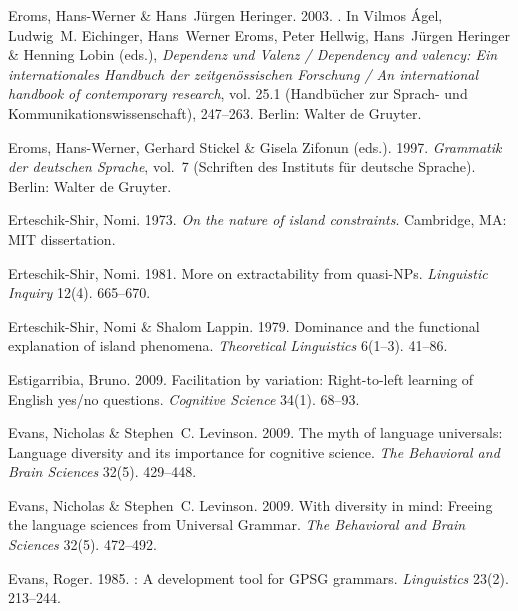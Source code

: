 \begin{thebibliography}{1420}
Eroms, Hans-Werner \& Hans~J{\"u}rgen Heringer. 2003.
.
\newblock In Vilmos {\'A}gel, Ludwig~M. Eichinger, Hans~Werner Eroms, Peter
  Hellwig, Hans~J{\"u}rgen Heringer \& Henning Lobin (eds.), \emph{{Dependenz
  und Valenz} / {Dependency} and valency: {Ein internationales Handbuch der
  zeitgen{\"o}ssischen Forschung} / {An} international handbook of contemporary
  research}, vol. 25.1  (Hand\-b{\"u}\-cher zur Sprach- und
  Kommunikationswissenschaft), 247--263. Berlin: Walter de Gruyter.

Eroms, Hans-Werner, Gerhard Stickel \& Gisela Zifonun (eds.). 1997.
\newblock \emph{{Grammatik der deutschen Sprache}}, vol.~7  (Schriften des
  Instituts f{\"u}r deutsche Sprache).
\newblock Berlin: Walter de Gruyter.

Erteschik-Shir, Nomi. 1973.
\newblock \emph{On the nature of island constraints}.
\newblock Cambridge, MA: MIT dissertation.

{Erteschik-Shir}, Nomi. 1981.
\newblock More on extractability from quasi-{NPs}.
\newblock \emph{Linguistic Inquiry} 12(4). 665--670.

{Erteschik-Shir}, Nomi \& Shalom Lappin. 1979.
\newblock Dominance and the functional explanation of island phenomena.
\newblock \emph{Theoretical Linguistics} 6(1--3). 41--86.

Estigarribia, Bruno. 2009.
\newblock Facilitation by variation: Right-to-left learning of {English} yes/no
  questions.
\newblock \emph{Cognitive Science} 34(1). 68--93.

Evans, Nicholas \& Stephen~C. Levinson. 2009{}.
\newblock The myth of language universals: {Language} diversity and its
  importance for cognitive science.
\newblock \emph{The Behavioral and Brain Sciences} 32(5). 429--448.

Evans, Nicholas \& Stephen~C. Levinson. 2009{}.
\newblock With diversity in mind: Freeing the language sciences from {Universal
  Grammar}.
\newblock \emph{The Behavioral and Brain Sciences} 32(5). 472--492.

Evans, Roger. 1985.
: {A} development tool for {GPSG} grammars.
\newblock \emph{Linguistics} 23(2). 213--244.


\end{thebibliography}
